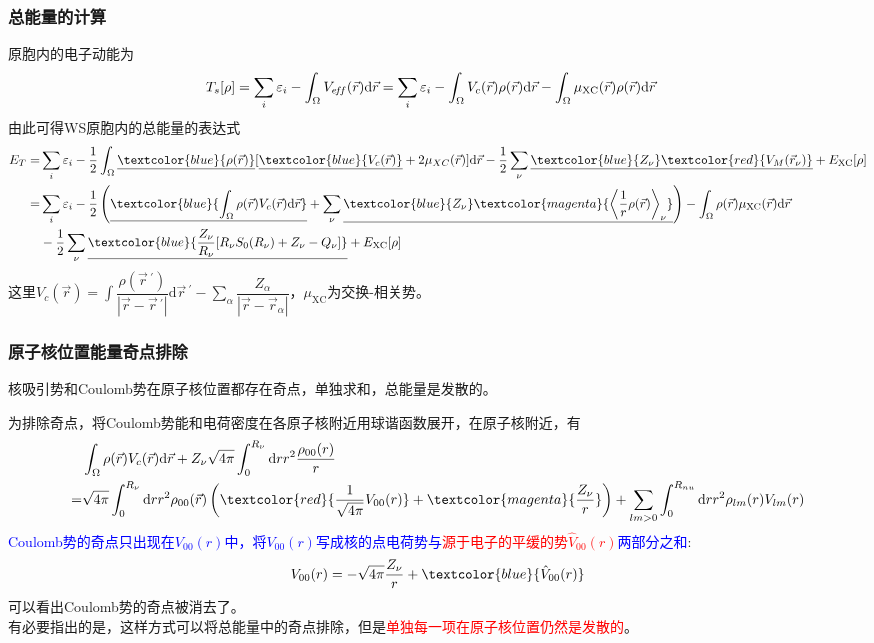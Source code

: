 {\frame
{
\frametitle{总能量的计算}
原胞内的电子动能为
\begin{displaymath}
	\hspace*{-10pt}
	T_s[\rho]=\sum_i\varepsilon_i-\int_{\Omega}V_{e\!f\!f}(\vec r)\mathrm{d}\vec r=\sum_i\varepsilon_i-\int_{\Omega}V_c(\vec r)\rho(\vec r)\mathrm{d}\vec r-\int_{\Omega}\mu_{\mathrm{XC}}(\vec r)\rho(\vec r)\mathrm{d}\vec r
\end{displaymath}
由此可得\textrm{WS}原胞内的总能量的表达式
{\fontsize{9.5pt}{5.2pt}\selectfont
\begin{displaymath}
\begin{split}
	E_T=&\sum_i\varepsilon_i-\frac12\int_{\Omega}\underline{\textcolor{blue}{\rho(\vec r)}}[\underline{\textcolor{blue}{V_c(\vec r)}}+2\mu_{XC}(\vec r)]\mathrm{d}\vec r-\frac12\sum_{\nu}\underline{\textcolor{blue}{Z_{\nu}}\textcolor{red}{V_M(\vec r_{\nu})}}+E_{\mathrm{XC}}[\rho] \\
	=&\sum_i\varepsilon_i-\frac12\left(\underline{\textcolor{blue}{\int_{\Omega}\rho(\vec r)V_c(\vec r)\mathrm{d}\vec r}}+\sum_{\nu}\underline{\textcolor{blue}{Z_{\nu}}\textcolor{magenta}{\bigg\langle\frac1r\rho(\vec r)\bigg\rangle_{\nu}}}\right)-%
   \int_{\Omega}\rho(\vec r)\mu_{\mathrm{XC}}(\vec r)\mathrm{d}\vec r \\
   &-\frac12\sum_{\nu}\underline{\textcolor{blue}{\frac{Z_{\nu}}{R_{\nu}}[R_{\nu}S_0(R_{\nu})+Z_{\nu}-Q_{\nu}]}}+E_{\mathrm{XC}}[\rho]
\end{split}
\end{displaymath}
}
这里$V_c(\vec r)\!=\!\displaystyle\int\dfrac{\rho(\vec r\,^\prime)}{|\vec r-{\vec r}\,^\prime|}\mathrm{d}\vec r\,^\prime-\sum\limits_{\alpha}\dfrac{Z_{\alpha}}{|\vec r-\vec r_{\alpha}|}$，$\mu_{\mathrm{XC}}$为交换-相关势。
}

\frame
{
\frametitle{原子核位置能量奇点排除}
核吸引势和\textrm{Coulomb}势在原子核位置都存在奇点，单独求和，总能量是发散的。

为排除奇点，将\textrm{Coulomb}势能和电荷密度在各原子核附近用球谐函数展开，在原子核附近，有
{\fontsize{9.0pt}{5.2pt}\selectfont
\begin{displaymath}
  \begin{split}
    &\int_{\Omega}\rho(\vec r)V_c(\vec r)\mathrm{d}\vec r+Z_{\nu}\sqrt{4\pi}\int_0^{R_{\nu}}\mathrm{d}rr^2\frac{\rho_{00}(r)}r\\
    =&\sqrt{4\pi}\int_0^{R_{\nu}}\mathrm{d}rr^2\rho_{00}(\vec r)\left(\textcolor{red}{\dfrac1{\sqrt{4\pi}}V_{00}(r)}+\textcolor{magenta}{\frac{Z_{\nu}}r}\right)+\sum_{lm>0}\int_0^{R_{nu}}\mathrm{d}rr^2\rho_{lm}(r)V_{lm}(r)
  \end{split}
\end{displaymath}
}
\textcolor{blue}{\textrm{Coulomb}势的奇点只出现在$V_{00}(r)$中，将$V_{00}(r)$写成核的点电荷势与\textcolor{red}{源于电子的平缓的势$\hat V_{00}(r)$}两部分之和}:~
\textcolor{red}{$$V_{00}(r)=-\sqrt{4\pi}\frac{Z_{\nu}}r+\textcolor{blue}{\hat V_{00}(r)}$$}
可以看出\textrm{Coulomb}势的奇点被消去了。\\有必要指出的是，这样方式可以将总能量中的奇点排除，但是\textcolor{red}{单独每一项在原子核位置仍然是发散的}。
}

}
